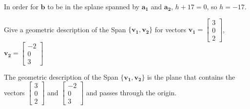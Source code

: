 \documentclass{../mathhomework}
\newcommand{\Vect}[1]{\pmb{#1}}
\begin{document}
\begin{problem}[1.3\#17]
\begin{solution}
        In order for $\Vect{b}$ to be in the splane spanned by $\Vect{a_1}$ and $\Vect{a_2}$, $h + 17 = 0$, so $h = -17$.
    \end{solution}
\end{problem}

\pagebreak
\begin{problem}[1.3\#19]
    Give a geometric description of the Span $\{\Vect{v_1}, \Vect{v_2}\}$ for vectors 
    $\Vect{v_1} = \begin{bmatrix}3 \\ 0 \\ 2\end{bmatrix}$,
    $\Vect{v_2} = \begin{bmatrix}-2 \\ 0 \\ 3\end{bmatrix}$

    \begin{solution}
        The geometric description of the Span $\{\Vect{v_1}, \Vect{v_2}\}$ is the plane that contains the vectors $\begin{bmatrix}3 \\ 0 \\ 2\end{bmatrix}$ and $\begin{bmatrix}-2 \\ 0 \\ 3\end{bmatrix}$ and passes through the origin.
    \end{solution}
\end{problem}
\end{document}
